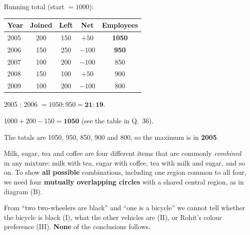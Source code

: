 Running total (start $=1000$):
\begin{center}\small
\begin{tabular}{lcccc}\toprule Year & Joined & Left & Net & Employees\\\midrule
2005 & 200 & 150 & $+50$ & \textbf{1050}\\ 2006 & 150 & 250 & $-100$ & \textbf{950}\\ 2007 & 100 & 200 & $-100$ & 850\\ 2008 & 150 & 100 & $+50$ & 900\\ 2009 & 100 & 200 & $-100$ & 800\\\bottomrule
\end{tabular}
\end{center}
2005 : 2006 $=1050:950=\mathbf{21:19}$.

$1000+200-150=\mathbf{1050}$ (see the table in Q.~36).

The totals are 1050, 950, 850, 900 and 800, so the maximum is in \textbf{2005}.


Milk, sugar, tea and coffee are four different items that are commonly \emph{combined} in any mixture: milk with tea, sugar with coffee, tea with milk and sugar, and so on. To show \textbf{all possible} combinations, including one region common to all four, we need four \textbf{mutually overlapping circles} with a shared central region, as in diagram (B).

From ``two two-wheelers are black'' and ``one is a bicycle'' we cannot tell whether the bicycle is black (I), what the other vehicles are (II), or Rohit's colour preference (III). \textbf{None} of the conclusions follows.


